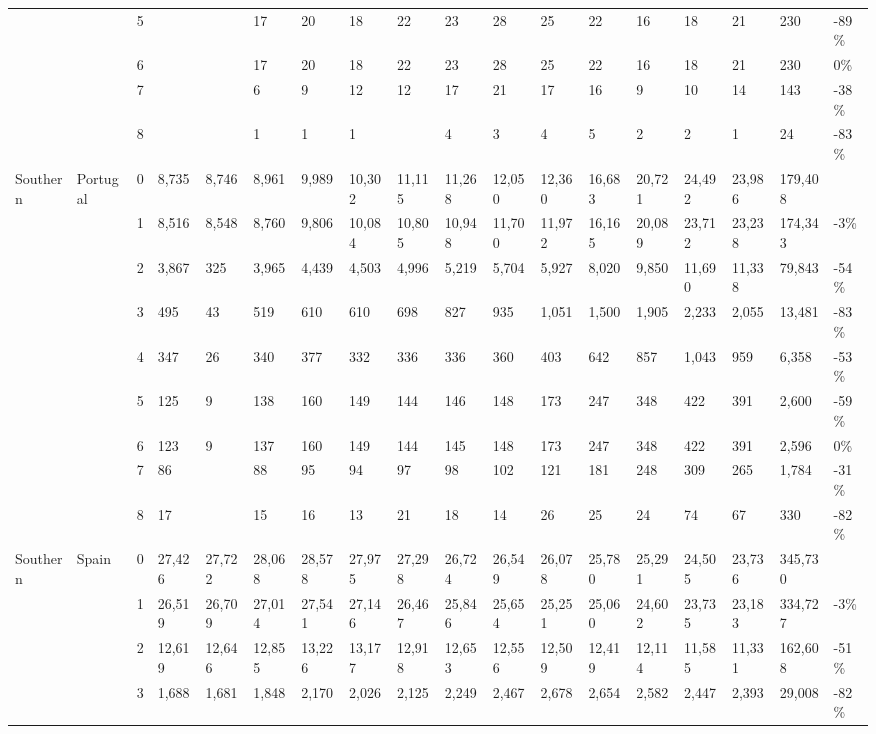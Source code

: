 \begin{longtable}{llllllllllllllllll}
   &  & 5 &  &  & 17 & 20 & 18 & 22 & 23 & 28 & 25 & 22 & 16 & 18 & 21 & 230 & -89\% \\ 
   &  & 6 &  &  & 17 & 20 & 18 & 22 & 23 & 28 & 25 & 22 & 16 & 18 & 21 & 230 & 0\% \\ 
   &  & 7 &  &  & 6 & 9 & 12 & 12 & 17 & 21 & 17 & 16 & 9 & 10 & 14 & 143 & -38\% \\ 
   &  & 8 &  &  & 1 & 1 & 1 &  & 4 & 3 & 4 & 5 & 2 & 2 & 1 & 24 & -83\% \\ 
  Southern & Portugal & 0 & 8,735 & 8,746 & 8,961 & 9,989 & 10,302 & 11,115 & 11,268 & 12,050 & 12,360 & 16,683 & 20,721 & 24,492 & 23,986 & 179,408 &  \\ 
   &  & 1 & 8,516 & 8,548 & 8,760 & 9,806 & 10,084 & 10,805 & 10,948 & 11,700 & 11,972 & 16,165 & 20,089 & 23,712 & 23,238 & 174,343 & -3\% \\ 
   &  & 2 & 3,867 & 325 & 3,965 & 4,439 & 4,503 & 4,996 & 5,219 & 5,704 & 5,927 & 8,020 & 9,850 & 11,690 & 11,338 & 79,843 & -54\% \\ 
   &  & 3 & 495 & 43 & 519 & 610 & 610 & 698 & 827 & 935 & 1,051 & 1,500 & 1,905 & 2,233 & 2,055 & 13,481 & -83\% \\ 
   &  & 4 & 347 & 26 & 340 & 377 & 332 & 336 & 336 & 360 & 403 & 642 & 857 & 1,043 & 959 & 6,358 & -53\% \\ 
   &  & 5 & 125 & 9 & 138 & 160 & 149 & 144 & 146 & 148 & 173 & 247 & 348 & 422 & 391 & 2,600 & -59\% \\ 
   &  & 6 & 123 & 9 & 137 & 160 & 149 & 144 & 145 & 148 & 173 & 247 & 348 & 422 & 391 & 2,596 & 0\% \\ 
   &  & 7 & 86 &  & 88 & 95 & 94 & 97 & 98 & 102 & 121 & 181 & 248 & 309 & 265 & 1,784 & -31\% \\ 
   &  & 8 & 17 &  & 15 & 16 & 13 & 21 & 18 & 14 & 26 & 25 & 24 & 74 & 67 & 330 & -82\% \\ 
  Southern & Spain & 0 & 27,426 & 27,722 & 28,068 & 28,578 & 27,975 & 27,298 & 26,724 & 26,549 & 26,078 & 25,780 & 25,291 & 24,505 & 23,736 & 345,730 &  \\ 
   &  & 1 & 26,519 & 26,709 & 27,014 & 27,541 & 27,146 & 26,467 & 25,846 & 25,654 & 25,251 & 25,060 & 24,602 & 23,735 & 23,183 & 334,727 & -3\% \\ 
   &  & 2 & 12,619 & 12,646 & 12,855 & 13,226 & 13,177 & 12,918 & 12,653 & 12,556 & 12,509 & 12,419 & 12,114 & 11,585 & 11,331 & 162,608 & -51\% \\ 
   &  & 3 & 1,688 & 1,681 & 1,848 & 2,170 & 2,026 & 2,125 & 2,249 & 2,467 & 2,678 & 2,654 & 2,582 & 2,447 & 2,393 & 29,008 & -82\% \\ 

\end{longtable}
